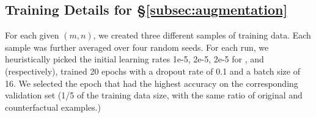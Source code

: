 \subsection{Training Details for \S\ref{subsec:augmentation}}
\label{appendix:data_collection}

For each given $(m,n)$, we created three different samples of training data.
Each sample was further averaged over four random seeds.
For each run, we heuristically picked the initial learning rates 1e-5, 2e-5, 2e-5 for \sst, \nli and \qqp (respectively), trained 20 epochs with a dropout rate of 0.1 and a batch size of 16. 
We selected the epoch that had the highest accuracy on the corresponding validation set (1/5 of the training data size, with the same ratio of original and counterfactual examples.)

